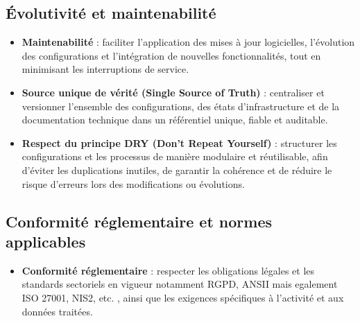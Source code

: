 \subsection{Évolutivité et maintenabilité}

\begin{itemize}
	\item \textbf{Maintenabilité} : faciliter l'application des mises à jour logicielles, l'évolution des configurations et l'intégration de nouvelles fonctionnalités, tout en minimisant les interruptions de service.

	\item \textbf{Source unique de vérité (Single Source of Truth)} : centraliser et versionner l'ensemble des configurations, des états d'infrastructure et de la documentation technique dans un référentiel unique, fiable et auditable.

	\item \textbf{Respect du principe DRY (Don’t Repeat Yourself)} : structurer les configurations et les processus de manière modulaire et réutilisable, afin d'éviter les duplications inutiles, de garantir la cohérence et de réduire le risque d'erreurs lors des modifications ou évolutions.

\end{itemize}

\subsection{Conformité réglementaire et normes applicables}

\begin{itemize}
	\item \textbf{Conformité réglementaire} : respecter les obligations légales et les standards sectoriels en vigueur notamment RGPD, ANSII mais egalement ISO 27001, NIS2, etc. , ainsi que les exigences spécifiques à l'activité et aux données traitées.
\end{itemize}



